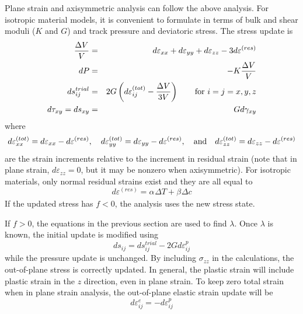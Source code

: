 \documentclass[11pt]{book}
\def\a#1{\alpha_{#1}}
\def\b#1{\beta_{#1}}
\def\DT{\Delta T}
\def\er#1{\varepsilon_{#1}^{(res)}}
\def\s#1{\sigma_{#1}}
\begin{document}
Plane strain and axisymmetric analysis can follow the above analysis. For isotropic material models, it is convenient to formulate in terms of bulk and shear moduli ($K$ and $G$) and track pressure and deviatoric stress. The stress update is
\begin{eqnarray}
       {\Delta V\over V} & = & d\varepsilon_{xx} + d\varepsilon_{yy} + d\varepsilon_{zz}  - 3d\er{} \\
       dP & = & -K {\Delta V\over V} \\
       ds_{ij}^{trial} & = & 2G \left(d\varepsilon_{ij}^{(tot)} - {\Delta V\over 3V}\right)   \qquad {\rm for\ }i=j=x,y,z\\
       d\tau_{xy} = ds_{xy} & = & G d\gamma_{xy} \\
\end{eqnarray}
where
\begin{equation}
      d\varepsilon_{xx}^{(tot)} = d\varepsilon_{xx} - d\er{}, \quad
      d\varepsilon_{yy}^{(tot)} = d\varepsilon_{yy} - d\er{}, \quad {\rm and}\quad
      d\varepsilon_{zz}^{(tot)} =  d\varepsilon_{zz} - d\er{}
\end{equation}
are the strain increments relative to the increment in residual strain (note that in plane strain, $ d\varepsilon_{zz}=0$, but it may be nonzero when axisymmetric). For isotropic materials, only normal residual strains exist and they are all equal to
\begin{equation}
      d\er{} = \a{}\DT + \b{}\Delta c
\end{equation}
If the updated stress has $f<0$, the analysis uses the new stress state.

If $f>0$, the equations in the previous section are used to find $\lambda$. Once $\lambda$ is known, the initial update is modified using
\begin{equation}
     ds_{ij} = ds_{ij}^{trial} - 2G d\varepsilon_{ij}^{p} 
\end{equation}
while the pressure update is unchanged.
By including $\s{zz}$ in the calculations, the out-of-plane stress is correctly updated. In general, the plastic strain will include plastic strain in the $z$ direction, even in plane strain. To keep zero total strain when in plane strain analysis, the out-of-plane elastic strain update will be
\begin{equation}
       d\varepsilon_{ij}^{e} = -d\varepsilon_{ij}^{p}  
\end{equation}
\end{document}
